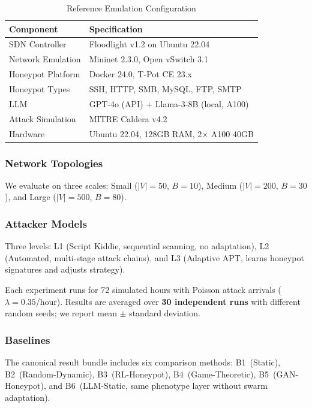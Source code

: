 \documentclass[review,3p,twocolumn]{elsarticle}
\begin{document}
\begin{table}[t]
\centering
\caption{Reference Emulation Configuration}
\label{tab:setup}
\small
\begin{tabular}{@{}ll@{}}
\toprule
\textbf{Component} & \textbf{Specification} \\
\midrule
SDN Controller & Floodlight v1.2 on Ubuntu 22.04 \\
Network Emulation & Mininet 2.3.0, Open vSwitch 3.1 \\
Honeypot Platform & Docker 24.0, T-Pot CE 23.x \\
Honeypot Types & SSH, HTTP, SMB, MySQL, FTP, SMTP \\
LLM & GPT-4o (API) + Llama-3-8B (local, A100) \\
Attack Simulation & MITRE Caldera v4.2 \\
Hardware & Ubuntu 22.04, 128GB RAM, 2$\times$ A100 40GB \\
\bottomrule
\end{tabular}
\end{table}

\subsubsection{Network Topologies}

We evaluate on three scales: Small ($|V|{=}50$, $B{=}10$), Medium ($|V|{=}200$, $B{=}30$), and Large ($|V|{=}500$, $B{=}80$).

\subsubsection{Attacker Models}

Three levels: L1 (Script Kiddie, sequential scanning, no adaptation), L2 (Automated, multi-stage attack chains), and L3 (Adaptive APT, learns honeypot signatures and adjusts strategy).

Each experiment runs for 72 simulated hours with Poisson attack arrivals ($\lambda{=}0.35$/hour). Results are averaged over \textbf{30 independent runs} with different random seeds; we report mean $\pm$ standard deviation.

\subsubsection{Baselines}

The canonical result bundle includes six comparison methods: B1~(Static), B2~(Random-Dynamic), B3~(RL-Honeypot), B4~(Game-Theoretic), B5~(GAN-Honeypot), and B6~(LLM-Static, same phenotype layer without swarm adaptation).
\end{document}
